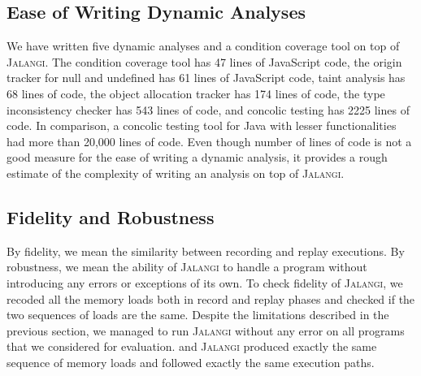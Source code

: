 \documentclass{sig-alternate}
\def\jalangi{\textsc{Jalangi}}
\newcommand \usl [1] {\mbox{\underline{\tt #1}}\xspace}
\newcommand \analysis{\usl{anlys}}
\begin{document}
\subsection{Ease of Writing Dynamic Analyses}
\label{sec:ease-writing-dynamic}

We have written five dynamic analyses and a condition coverage tool on
top of \jalangi{}.  The condition coverage tool has 47 lines of
JavaScript code, the origin tracker for null and undefined has 61
lines of JavaScript code, taint analysis has 68 lines of code, the
object allocation tracker has 174 lines of code, the type
inconsistency checker has 543 lines of code, and concolic testing has
2225 lines of code.  In comparison, a concolic testing tool for Java
with lesser functionalities had more than 20,000 lines of code.  Even
though number of lines of code is not a good measure for the ease of
writing a dynamic analysis, it provides a rough estimate of the
complexity of writing an analysis on top of \jalangi{}.  %

\subsection{Fidelity and Robustness}
\label{sec:fidelity-robustness}

By fidelity, we mean the similarity between recording and replay
executions.  By robustness, we mean the ability of \jalangi{} to
handle a program without introducing any errors or exceptions of its
own.  To check fidelity of \jalangi{}, we recoded all the memory loads
both in record and replay phases and checked if the two sequences of
loads are the same.  %
Despite the limitations described in the previous section, we managed
to run \jalangi{} without any error on all programs that we considered
for evaluation.  %
and \jalangi{} produced exactly the same sequence of memory loads and
followed exactly the same execution paths.
\end{document}
